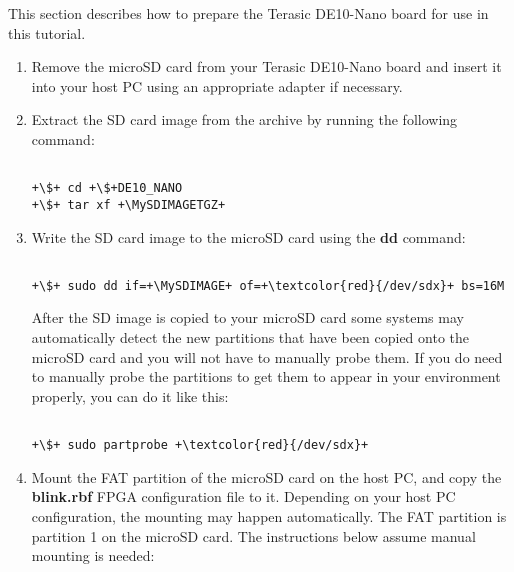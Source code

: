 \begin{flushleft}
\noindent

This section describes how to prepare the Terasic DE10-Nano board for use in this tutorial.

\begin{enumerate}[
	label=\textbf{Step \arabic*.},
	leftmargin=*,
	widest={00},
	align=left]

\item Remove the microSD card from your Terasic DE10-Nano board and insert it into your host PC using an appropriate adapter if necessary.

\item Extract the SD card image from the archive by running the following command:

\begin{verbatim}

+\$+ cd +\$+DE10_NANO
+\$+ tar xf +\MySDIMAGETGZ+

\end{verbatim}

\item Write the SD card image to the microSD card using the \textbf{dd} command:

\begin{verbatim}

+\$+ sudo dd if=+\MySDIMAGE+ of=+\textcolor{red}{/dev/sdx}+ bs=16M

\end{verbatim}

After the SD image is copied to your microSD card some systems may automatically detect the new partitions that have been copied onto the microSD card and you will not have to manually probe them.  If you do need to manually probe the partitions to get them to appear in your environment properly, you can do it like this:

\begin{verbatim}

+\$+ sudo partprobe +\textcolor{red}{/dev/sdx}+

\end{verbatim}

\item Mount the FAT partition of the microSD card on the host PC, and copy the \textbf{blink.rbf} FPGA configuration file to it. Depending on your host PC configuration, the mounting may happen automatically. The FAT partition is partition 1 on the microSD card.  The instructions below assume manual mounting is needed:


\end{enumerate}
\end{flushleft}
